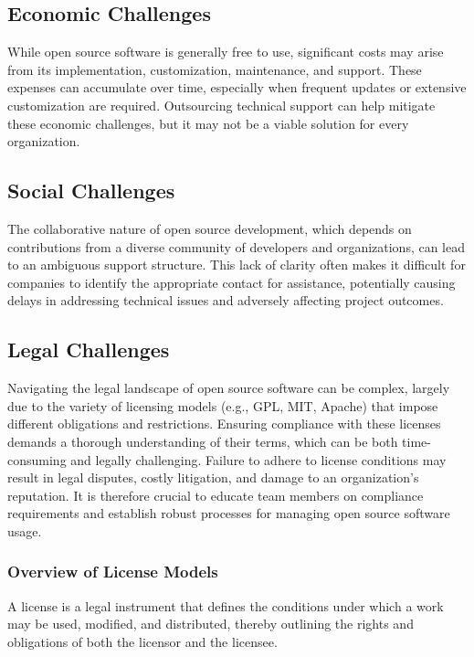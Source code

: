 \subsection{Economic Challenges}

While open source software is generally free to use, significant costs may arise from its implementation, customization, maintenance, and support. These expenses can accumulate over time, especially when frequent updates or extensive customization are required. Outsourcing technical support can help mitigate these economic challenges, but it may not be a viable solution for every organization.

\subsection{Social Challenges}

The collaborative nature of open source development, which depends on contributions from a diverse community of developers and organizations, can lead to an ambiguous support structure. This lack of clarity often makes it difficult for companies to identify the appropriate contact for assistance, potentially causing delays in addressing technical issues and adversely affecting project outcomes.

\subsection{Legal Challenges}

Navigating the legal landscape of open source software can be complex, largely due to the variety of licensing models (e.g., GPL, MIT, Apache) that impose different obligations and restrictions. Ensuring compliance with these licenses demands a thorough understanding of their terms, which can be both time-consuming and legally challenging. Failure to adhere to license conditions may result in legal disputes, costly litigation, and damage to an organization’s reputation. It is therefore crucial to educate team members on compliance requirements and establish robust processes for managing open source software usage.

\cite{OpenSource-Legal-Guide}

\subsubsection{Overview of License Models}

A license is a legal instrument that defines the conditions under which a work may be used, modified, and distributed, thereby outlining the rights and obligations of both the licensor and the licensee.

